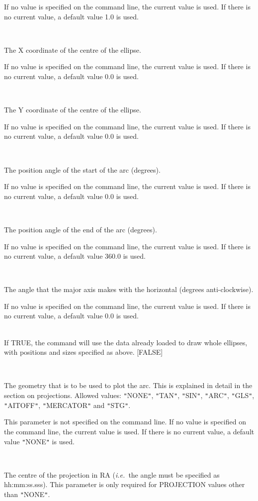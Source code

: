 \documentclass[twoside,11pt]{article}
\renewcommand{\_}{\texttt{\symbol{95}}}
\newcommand{\ie}{{\em i.e.\ }}
\newcommand{\sstsubsection}[1]{ \item[{#1}] \mbox{} \\}
\newcommand{\sstsubsection}[1]{\item[{#1}]}
\begin{document}
\begin{sloppypar}
{{{         If no value is specified on the command line, the current
         value is used.  If there is no current value, a default value
         1.0 is used.
      }
      \sstsubsection{
         X0 = \_DOUBLE (Read and Write)
      }{
         The X coordinate of the centre of the ellipse.

         If no value is specified on the command line, the current
         value is used. If there is no current value, a default value
         0.0 is used.
      }
      \sstsubsection{
         Y0 = \_DOUBLE (Read and Write)
      }{
         The Y coordinate of the centre of the ellipse.

         If no value is specified on the command line, the current
         value is used. If there is no current value, a default value
         0.0 is used.
      }
      \sstsubsection{
         PASTART = \_REAL (Read and Write)
      }{
         The position angle of the start of the arc (degrees).

         If no value is specified on the command line, the current
         value is used. If there is no current value, a default value
         0.0 is used.
      }
      \sstsubsection{
         PAEND = \_REAL (Read and Write)
      }{
         The position angle of the end of the arc (degrees).

         If no value is specified on the command line, the current
         value is used. If there is no current value, a default value
         360.0 is used.
      }
      \sstsubsection{
         ROTATION = \_REAL (Read and Write)
      }{
         The angle that the major axis makes with the horizontal
         (degrees anti-clockwise).

         If no value is specified on the command line, the current
         value is used. If there is no current value, a default value
         0.0 is used.
      }
      \sstsubsection{
         FROMDATA = \_LOGICAL (Read)
      }{
         If TRUE, the command will use the data already loaded to draw
         whole ellipses, with positions and sizes specified as above.
         [FALSE]
      }
      \sstsubsection{
         PROJECTION = \_CHAR (Read)
      }{
         The geometry that is to be used to plot the arc.  This is
         explained in detail in the section on projections.  Allowed
         values: {\tt "}NONE{\tt "}, {\tt "}TAN{\tt "}, {\tt "}SIN{\tt "}, {\tt "}ARC{\tt "}, {\tt "}GLS{\tt "}, {\tt "}AITOFF{\tt "},
         {\tt "}MERCATOR{\tt "} and {\tt "}STG{\tt "}.

         This parameter is not specified on the command line. If no
         value is specified on the command line, the current value is
         used. If there is no current value, a default value {\tt "}NONE{\tt "} is
         used.
      }
      \sstsubsection{
         RACENTRE = \_CHAR (Read)
      }{
         The centre of the projection in RA (\ie the angle must be
         specified as hh:mm:ss.sss). This parameter is only required for
         PROJECTION values other than {\tt "}NONE{\tt "}.

}}}
\end{sloppypar}
\end{document}
